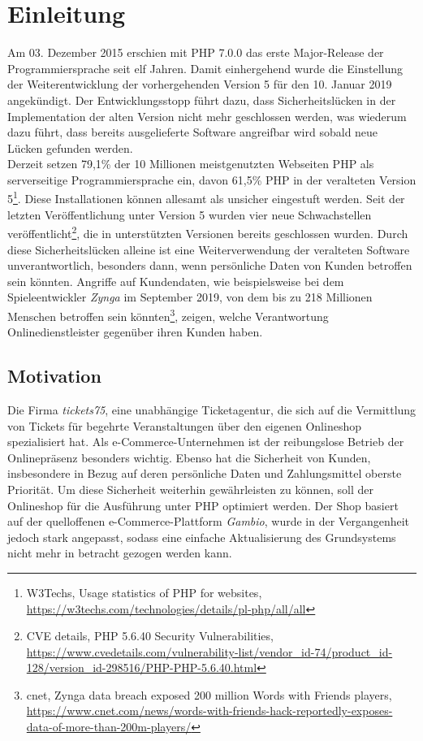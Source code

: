 \chapter{Einleitung}
Am 03. Dezember 2015 erschien mit PHP 7.0.0 das erste Major-Release der Programmiersprache seit elf Jahren. Damit einhergehend wurde die Einstellung der Weiterentwicklung der vorhergehenden Version
5 für den 10. Januar 2019 angekündigt. Der Entwicklungsstopp führt dazu, dass Sicherheitslücken in der Implementation der alten Version nicht mehr geschlossen werden, was 
wiederum dazu führt, dass bereits ausgelieferte Software angreifbar wird sobald neue Lücken gefunden werden. \\
Derzeit setzen 79,1\% der 10 Millionen meistgenutzten Webseiten PHP als serverseitige Programmiersprache ein, davon 61,5\% PHP in der veralteten Version 5\footnote{W3Techs, \glqq Usage statistics of PHP for websites\grqq , 
\url{https://w3techs.com/technologies/details/pl-php/all/all}}. Diese Installationen können allesamt als unsicher eingestuft werden. Seit der letzten Veröffentlichung 
unter Version 5 wurden vier neue Schwachstellen veröffentlicht\footnote{CVE details, \glqq PHP 5.6.40 Security Vulnerabilities\grqq , 
\url{https://www.cvedetails.com/vulnerability-list/vendor_id-74/product_id-128/version_id-298516/PHP-PHP-5.6.40.html}}, die in unterstützten Versionen bereits geschlossen 
wurden. Durch diese Sicherheitslücken alleine ist eine Weiterverwendung der veralteten Software unverantwortlich, besonders dann, wenn 
persönliche Daten von Kunden betroffen sein könnten. Angriffe auf Kundendaten, wie beispielsweise bei dem Spieleentwickler \textit{Zynga} im September 2019, 
von dem bis zu 218 Millionen Menschen betroffen sein könnten\footnote{cnet, Zynga data breach exposed 200 million Words with Friends players, \url{https://www.cnet.com/news/words-with-friends-hack-reportedly-exposes-data-of-more-than-200m-players/}}, 
zeigen, welche Verantwortung Onlinedienstleister gegenüber ihren Kunden haben. 

\section{Motivation}
Die Firma \textit{tickets75}, eine unabhängige Ticketagentur, die sich auf die Vermittlung von Tickets für begehrte 
Veranstaltungen über den eigenen Onlineshop spezialisiert hat. Als e-Commerce-Unternehmen ist der reibungslose Betrieb der 
Onlinepräsenz besonders wichtig. Ebenso hat die Sicherheit von Kunden, insbesondere in Bezug auf deren persönliche Daten und Zahlungsmittel oberste 
Priorität. Um diese Sicherheit weiterhin gewährleisten zu können, soll der Onlineshop für die Ausführung unter \ac{PHP} optimiert 
werden. Der Shop basiert auf der quelloffenen e-Commerce-Plattform \textit{Gambio}, wurde in der Vergangenheit jedoch stark 
angepasst, sodass eine einfache Aktualisierung des Grundsystems nicht mehr in betracht gezogen werden kann.

